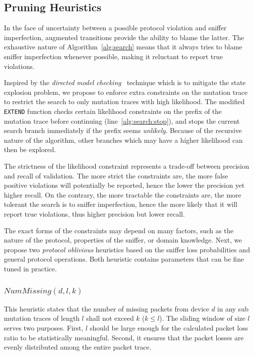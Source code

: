 \subsection{Pruning Heuristics}
\label{subsec:heuristic}

In the face of uncertainty between a possible
protocol violation and sniffer imperfection, augmented transitions provide the
ability to blame the latter. The exhaustive nature of
Algorithm~\ref{alg:search} means that it always tries to blame sniffer
imperfection whenever possible, making it reluctant to report true
violations.

Inspired by the \textit{directed model checking}~\cite{edelkamp2008survey}
technique which is to mitigate the state explosion problem, we propose to enforce extra
constraints on the mutation trace to restrict the search to only mutation traces
with high likelihood. The modified \texttt{EXTEND} function checks certain
likelihood constraints on the prefix of the mutation trace before continuing
(line~\ref{alg:search:stop}), and stops the current search branch immediately if
the prefix seems \textit{unlikely}.  Because of the recursive nature of the
algorithm, other branches which may have a higher likelihood can then be
explored.

The strictness of the likelihood constraint represents a trade-off between
precision and recall of validation. The more strict the constraints are, the
more false positive violations will potentially be reported, hence the lower the
precision yet higher recall. On the contrary, the more tractable the
constraints are, the more tolerant the search is to sniffer imperfection, hence
the more likely that it will report true violations, thus higher precision but
lower recall.

The exact forms of the constraints may depend on many factors, such as the
nature of the protocol, properties of the sniffer, or domain knowledge.  Next,
we propose two \textit{protocol oblivious} heuristics based on the sniffer loss
probabilities and general protocol operations. Both heuristic contains
parameters that can be fine tuned in practice.

\vspace*{-3mm}
\subsubsection{$\mathit{NumMissing}(d, l, k)$}

This heuristic states that the number of missing packets from device $d$ in any
sub mutation traces of length $l$ shall not exceed $k$ ($k \le l$).  The sliding
window of size $l$ serves two purposes. First, $l$ should be large enough for
the calculated packet loss ratio to be statistically meaningful.  Second, it
ensures that the packet losses are evenly distributed among the entire packet
trace.

